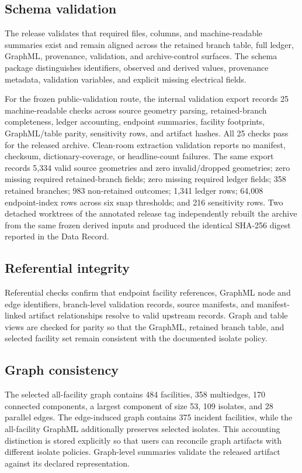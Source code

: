 \documentclass[10pt]{article}
\begin{document}
\subsection{Schema validation}

The release validates that required files, columns, and machine-readable summaries exist and remain aligned across the retained branch table, full ledger, GraphML, provenance, validation, and archive-control surfaces. The schema package distinguishes identifiers, observed and derived values, provenance metadata, validation variables, and explicit missing electrical fields.

For the frozen public-validation route, the internal validation export records 25 machine-readable checks across source geometry parsing, retained-branch completeness, ledger accounting, endpoint summaries, facility footprints, GraphML/table parity, sensitivity rows, and artifact hashes. All 25 checks pass for the released archive. Clean-room extraction validation reports no manifest, checksum, dictionary-coverage, or headline-count failures. The same export records 5,334 valid source geometries and zero invalid/dropped geometries; zero missing required retained-branch fields; zero missing required ledger fields; 358 retained branches; 983 non-retained outcomes; 1,341 ledger rows; 64,008 endpoint-index rows across six snap thresholds; and 216 sensitivity rows. Two detached worktrees of the annotated release tag independently rebuilt the archive from the same frozen derived inputs and produced the identical SHA-256 digest reported in the Data Record.

\subsection{Referential integrity}

Referential checks confirm that endpoint facility references, GraphML node and edge identifiers, branch-level validation records, source manifests, and manifest-linked artifact relationships resolve to valid upstream records. Graph and table views are checked for parity so that the GraphML, retained branch table, and selected facility set remain consistent with the documented isolate policy.

\subsection{Graph consistency}

The selected all-facility graph contains 484 facilities, 358 multiedges, 170 connected components, a largest component of size 53, 109 isolates, and 28 parallel edges. The edge-induced graph contains 375 incident facilities, while the all-facility GraphML additionally preserves selected isolates. This accounting distinction is stored explicitly so that users can reconcile graph artifacts with different isolate policies. Graph-level summaries validate the released artifact against its declared representation.
\end{document}

